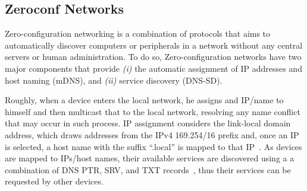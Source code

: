 \subsection{Zeroconf Networks}
\label{sec:zeroconf}



Zero-configuration networking is a combination of protocols that aims to automatically discover computers or peripherals in a network without any central servers or human administration. To do so, Zero-configuration networks have two major components that provide {\it (i)} the automatic assignment of IP addresses and host naming (mDNS), and {\it (ii)} service discovery (DNS-SD).


Roughly, when a device enters the local network, he assigns and IP/name to himself and then multicast that to the local network, resolving any name conflict that may occur in such process. IP assignment considers the link-local domain address, which draws addresses from the IPv4 169.254/16 prefix and, once an IP is selected, a host name with the suffix ``.local'' is mapped to that IP~\cite{rfc6762}. As devices are mapped to IPs/host names, their available services are discovered using a a combination of DNS PTR, SRV, and TXT records~\cite{rfc6763}, thus their services can be requested by other devices. 


